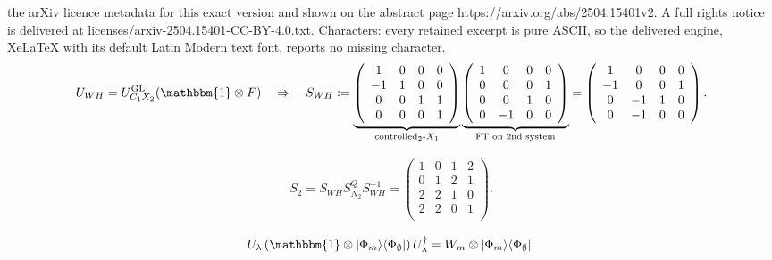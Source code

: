 \documentclass[10pt,a4paper]{amsart}
\DeclareMathOperator{\GL}{GL}
\def\Id{\mathbbm{1}}
\begin{document}
the arXiv licence metadata for this exact version and shown on the abstract page https://arxiv.org/abs/2504.15401v2. A full rights notice is delivered at licenses/arxiv-2504.15401-CC-BY-4.0.txt. Characters: every retained excerpt is pure ASCII, so the delivered engine, XeLaTeX with its default Latin Modern text font, reports no missing character.
\begin{align}\label{eqn:swh}
	U_{WH}
	=
	U^{\GL}_{C_1X_2}
	(\Id\otimes F)
	\quad
	\Rightarrow
	\quad
	S_{WH}
	:=
	\underbrace{
		\left(
			\begin{array}{cccc}
			 1 & 0 & 0 & 0 \\
			 -1 & 1 & 0 & 0 \\
			 0 & 0 & 1 & 1 \\
			 0 & 0 & 0 & 1 \\
			\end{array}
		\right)
	}_{\text{controlled$_2$-$X_1$}}
	\underbrace{
		\left(
			\begin{array}{cccc}
			 1 & 0 & 0 & 0 \\
			 0 & 0 & 0 & 1 \\
			 0 & 0 & 1 & 0 \\
			 0 & -1 & 0 & 0 \\
			\end{array}
		\right)
	}_{\text{FT on 2nd system}}
	=
	 \left(
	 	\begin{array}{cccc}
	 	 1  & 0  & 0 & 0 \\
	 	 -1 & 0  & 0 & 1 \\
	 	 0  & -1 & 1 & 0 \\
	 	 0  & -1 & 0 & 0 \\
	 	\end{array}
	 \right)
	.
\end{align}

\begin{align}\label{eqn:23cliff}
	S_2
	=
	S_{WH}
	S_{N_2}^Q
	S_{WH}^{-1}
	=
	\left(
	\begin{array}{cccc}
	 1 & 0 & 1 & 2 \\
	 0 & 1 & 2 & 1 \\
	 2 & 2 & 1 & 0 \\
	 2 & 2 & 0 & 1 \\
	\end{array}
	\right)
	.
\end{align}

\begin{align}\label{eqn:controlled_wm}
	U_\lambda\, (\Id\otimes |\Phi_m\rangle\langle\Phi_\emptyset|) \,U_\lambda^\dagger
	=
	W_m \otimes |\Phi_m\rangle\langle\Phi_\emptyset| .
\end{align}
\end{document}
